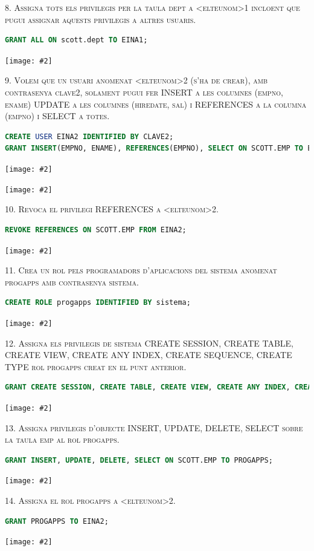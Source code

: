 \documentclass[a4paper,12pt]{article}
\newcommand{\mygraphic}[2][width=\textwidth]{\begin{center}
		\centering\texttt{[image: \#2]}\par
\end{center}}
\begin{document}
\textsc{8. Assigna tots els privilegis per la taula dept a <elteunom>1 incloent que pugui assignar aquests privilegis a altres usuaris.}
\begin{lstlisting}[language=SQL]
GRANT ALL ON scott.dept TO EINA1;
\end{lstlisting}
\mygraphic{imatges/8.png}

\textsc{9. Volem que un usuari anomenat <elteunom>2 (s'ha de crear), amb contrasenya clave2, solament pugui fer INSERT a les columnes (empno, ename) UPDATE a les columnes (hiredate, sal) i REFERENCES a la columna (empno) i SELECT a totes.}
\begin{lstlisting}[language=SQL]
CREATE USER EINA2 IDENTIFIED BY CLAVE2;
GRANT INSERT(EMPNO, ENAME), REFERENCES(EMPNO), SELECT ON SCOTT.EMP TO EINA2;
\end{lstlisting}
\mygraphic{imatges/9a.png}
\mygraphic{imatges/9b.png}

\newpage
\textsc{10. Revoca el privilegi REFERENCES a <elteunom>2.}
\begin{lstlisting}[language=SQL]
REVOKE REFERENCES ON SCOTT.EMP FROM EINA2;
\end{lstlisting}
\mygraphic{imatges/10.png}

\textsc{11. Crea un rol pels programadors d'aplicacions del sistema anomenat progapps amb contrasenya sistema.}
\begin{lstlisting}[language=SQL]
CREATE ROLE progapps IDENTIFIED BY sistema;
\end{lstlisting}
\mygraphic{imatges/11.png}

\textsc{12. Assigna els privilegis de sistema CREATE SESSION, CREATE TABLE, CREATE VIEW, CREATE ANY INDEX, CREATE SEQUENCE, CREATE TYPE rol progapps creat en el punt anterior.}
\begin{lstlisting}[language=SQL]
GRANT CREATE SESSION, CREATE TABLE, CREATE VIEW, CREATE ANY INDEX, CREATE SEQUENCE, CREATE TYPE TO progapps;
\end{lstlisting}
\mygraphic{imatges/12.png}

\newpage
\textsc{13. Assigna privilegis d'objecte INSERT, UPDATE, DELETE, SELECT sobre la taula emp al rol progapps.}
\begin{lstlisting}[language=SQL]
GRANT INSERT, UPDATE, DELETE, SELECT ON SCOTT.EMP TO PROGAPPS;
\end{lstlisting}
\mygraphic{imatges/13.png}

\textsc{14. Assigna el rol progapps a <elteunom>2.}
\begin{lstlisting}[language=SQL]
GRANT PROGAPPS TO EINA2;
\end{lstlisting}
\mygraphic{imatges/14.png}
\end{document}
